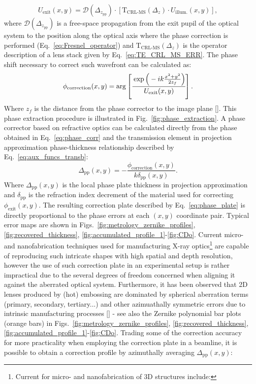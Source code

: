 \begin{refsection}
\begin{equation}\label{eq:U_exit}
    U_{\text{exit}}(x,y) =   \mathcal{D}(\Delta_{z_\text{pp}})\cdot\left[\mathrm{T}_{\text{CRL-MS}}(\Delta_z) \cdot U_{\text{illum.}}(x,y)\right],
\end{equation}
where $\mathcal{D}(\Delta_{z_\text{pp}})$ is a free-space propagation from the exit pupil of the optical system to the position along the optical axis where the phase correction is performed (Eq.~\ref{eq:Fresnel_operator}) and $\mathrm{T}_{\text{CRL-MS}}(\Delta_z)$ is the operator description of a lens stack given by Eq.~\ref{eq:TE_CRL_MS_ERR}. The phase shift necessary to correct such wavefront can be calculated as:
\begin{equation}\label{eq:phase_corr}
   \phi_{\text{correction}}(x,y) = \arg\left[\cfrac{\exp{\Big(-ik\frac{x^2 + y^2}{2z_f}\Big)}}{U_{\text{exit}}(x,y)}\right].
\end{equation}
Where $z_f$ is the distance from the phase corrector to the image plane [\cite{Seiboth2017}]. This phase extraction procedure is illustrated in Fig.~\ref{fig:phase_extraction}. A phase corrector based on refractive optics can be calculated directly from the phase obtained in Eq.~\ref{eq:phase_corr} and the transmission element in projection approximation phase-thickness relationship described by Eq.~\ref{eq:aux_funcs_transb}:
\begin{equation}\label{eq:phase_plate}
   \Delta_\text{pp}(x,y)=-\frac{\phi_{\text{correction}}(x,y)}{k\delta_\text{pp}(x,y)}.
\end{equation}
Where $\Delta_\text{pp}(x,y)$ is the local phase plate thickness in projection approximation and $\delta_\text{pp}$ is the refraction index decrement of the material used for correcting $ \phi_{\text{exit}}(x,y)$. The resulting correction plate described by Eq.~\ref{eq:phase_plate} is directly proportional to the phase errors at each $(x,y)$ coordinate pair. Typical error maps are shown in Figs.~\ref{fig:metrology_zernike_profiles}, \ref{fig:recovered_thickness}, \ref{fig:accumulated_profile_1}-\ref{fig:CDo}. Current micro- and nanofabrication techniques used for manufacturing X-ray optics\footnote{Current for micro- and nanofabrication of 3D structures include: } are capable of reproducing such intricate shapes with high spatial and depth resolution, however the use of such correction plate in an experimental setup is rather impractical due to the several degrees of freedom concerned when aligning it against the aberrated optical system. Furthermore, it has been observed that 2D lenses produced by (hot) embossing are dominated by spherical aberration terms (primary, secondary, tertiary...) and other azimuathally symmetric errors due to intrinsic manufacturing processes [\cite{Schropp2013, Uhlen2014, Seiboth2016, Seiboth2017, Celestre2020, Seiboth2020}] -  see also the Zernike polynomial bar plots (orange bars) in Figs.~\ref{fig:metrology_zernike_profiles}, \ref{fig:recovered_thickness}, \ref{fig:accumulated_profile_1}-\ref{fig:CDo}. Trading some of the correction accuracy for more practicality when employing the correction plate in a beamline, it is possible to obtain a correction profile by azimuthally averaging $\Delta_\text{pp}(x,y)$:

\end{refsection}
